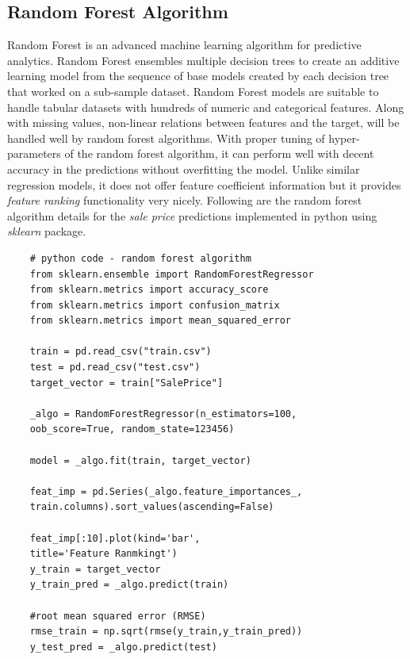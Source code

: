 \documentclass[sigconf]{acmart}
\begin{document}
	
	\subsection{Random Forest Algorithm}
	
	Random Forest is an advanced machine learning algorithm for predictive analytics. Random Forest ensembles multiple decision trees to create an additive learning model from the sequence of base models created by each decision tree that worked on a sub-sample dataset. Random Forest models are suitable to handle tabular datasets with hundreds of numeric and categorical features. Along with missing values, non-linear relations between features and the target, will be handled well by random forest algorithms. With proper tuning of hyper-parameters of the random forest algorithm, it can perform well with decent accuracy in the predictions without overfitting the model. Unlike similar regression models, it does not offer feature coefficient information but it provides {\em feature ranking} functionality very nicely. Following are the random forest algorithm details for the {\em sale price} predictions implemented in python using {\em sklearn} package.
	
	\begin{verbatim}		
	# python code - random forest algorithm
	from sklearn.ensemble import RandomForestRegressor
	from sklearn.metrics import accuracy_score
	from sklearn.metrics import confusion_matrix
	from sklearn.metrics import mean_squared_error
	
	train = pd.read_csv("train.csv")
	test = pd.read_csv("test.csv")
	target_vector = train["SalePrice"]
	
	_algo = RandomForestRegressor(n_estimators=100, 
	oob_score=True, random_state=123456)
	
	model = _algo.fit(train, target_vector)  
	
	feat_imp = pd.Series(_algo.feature_importances_, 
	train.columns).sort_values(ascending=False)
	
	feat_imp[:10].plot(kind='bar', 
	title='Feature Ranmkingt')		
	y_train = target_vector
	y_train_pred = _algo.predict(train)
	
	#root mean squared error (RMSE)
	rmse_train = np.sqrt(rmse(y_train,y_train_pred))			
	y_test_pred = _algo.predict(test)		
	\end{verbatim}
	
\end{document}
